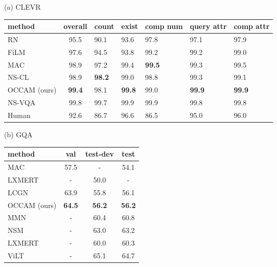 \documentclass[10pt,twocolumn,letterpaper]{article}
\begin{document}
\begin{figure*}
\vspace{-2mm}
\label{sota_comp}

  \begin{minipage}[b]{0.55\textwidth}
\small
\centering
(a) CLEVR
\begin{tabular}{l|c|p{0.45cm}p{0.45cm}p{0.53cm}p{0.53cm}p{0.53cm}}
        \toprule
         method & overall & count & exist & comp num & query attr & comp attr  \\
         \midrule
         RN \cite{santoro2017simple} & 95.5 & 90.1 & 93.6 & 97.8 & 97.1 & 97.9 \\
         FiLM \cite{perez2018film} & 97.6 & 94.5 & 93.8 & 99.2 & 99.2 & 99.0 \\
         MAC \cite{hudson2018compositional} & 98.9 & 97.2 & 99.4 & \textbf{99.5} & 99.3 & 99.5 \\
         NS-CL \cite{mao2018neuro} & 98.9 & \textbf{98.2} & 99.0 & 98.8 & 99.3 & 99.1\\
OCCAM (ours) & \textbf{99.4}&98.1&\textbf{99.8}&99.0&\textbf{99.9}&\textbf{99.9}\\
         \midrule
NS-VQA \cite{yi2018neural} & {99.8} & {99.7} & {99.9} & {99.9} & {99.8} & {99.8}\\ 
         \midrule
         Human \cite{johnson2017inferring} & 92.6 & 86.7 & 96.6 & 86.5 & 95.0 & 96.0 \\
         \bottomrule
    \end{tabular}
\end{minipage}
\begin{minipage}[b]{0.37\textwidth}
  \small
    \centering
    (b) GQA
\small
    \begin{tabular}{l|c|c|c}
        \toprule
         method  & val & test-dev & test  \\
         \midrule
MAC \cite{andreas2016neural} & 57.5 & - & 54.1 \\
         LXMERT \cite{tan2019lxmert}  & - & 50.0 & - \\
         LCGN \cite{hu2019language}  & 63.9 & 55.8 & 56.1 \\ 
         OCCAM (ours)  & \bf 64.5 & \bf 56.2 & \bf 56.2\\ 
         \midrule
         MMN \cite{chen2021meta} & - & 60.4 & 60.8 \\
         NSM \cite{hudson2019learning} & - & 63.0 & 63.2 \\
         LXMERT \cite{tan2019lxmert} & - & 60.0 & 60.3 \\
         ViLT \cite{kim2021vilt}  & - & 65.1 & 64.7 \\
         \bottomrule
    \end{tabular}
\end{minipage}
    \vspace{-3mm}
  \end{figure*}
\end{document}
